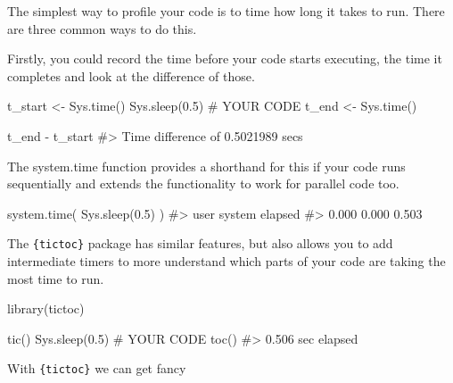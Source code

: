 \documentclass[
  letterpaper,
  DIV=11,
  numbers=noendperiod]{scrreprt}
\newenvironment{Shaded}{\begin{snugshade}}{\end{snugshade}}
\newcommand{\CommentTok}[1]{\textcolor[rgb]{0.37,0.37,0.37}{#1}}
\newcommand{\FloatTok}[1]{\textcolor[rgb]{0.68,0.00,0.00}{#1}}
\newcommand{\FunctionTok}[1]{\textcolor[rgb]{0.28,0.35,0.67}{#1}}
\newcommand{\NormalTok}[1]{\textcolor[rgb]{0.00,0.23,0.31}{#1}}
\newcommand{\OtherTok}[1]{\textcolor[rgb]{0.00,0.23,0.31}{#1}}
\newcommand{\SpecialCharTok}[1]{\textcolor[rgb]{0.37,0.37,0.37}{#1}}
\begin{document}
The simplest way to profile your code is to time how long it takes to
run. There are three common ways to do this.

Firstly, you could record the time before your code starts executing,
the time it completes and look at the difference of those.

\begin{Shaded}
\begin{Highlighting}[]
\NormalTok{t\_start }\OtherTok{\textless{}{-}} \FunctionTok{Sys.time}\NormalTok{()}
\FunctionTok{Sys.sleep}\NormalTok{(}\FloatTok{0.5}\NormalTok{) }\CommentTok{\# YOUR CODE}
\NormalTok{t\_end }\OtherTok{\textless{}{-}} \FunctionTok{Sys.time}\NormalTok{()}

\NormalTok{t\_end }\SpecialCharTok{{-}}\NormalTok{ t\_start}
\CommentTok{\#\textgreater{} Time difference of 0.5021989 secs}
\end{Highlighting}
\end{Shaded}

The system.time function provides a shorthand for this if your code runs
sequentially and extends the functionality to work for parallel code
too.

\begin{Shaded}
\begin{Highlighting}[]
\FunctionTok{system.time}\NormalTok{(}
  \FunctionTok{Sys.sleep}\NormalTok{(}\FloatTok{0.5}\NormalTok{)}
\NormalTok{)}
\CommentTok{\#\textgreater{}    user  system elapsed }
\CommentTok{\#\textgreater{}   0.000   0.000   0.503}
\end{Highlighting}
\end{Shaded}

The \texttt{\{tictoc\}} package has similar features, but also allows
you to add intermediate timers to more understand which parts of your
code are taking the most time to run.

\begin{Shaded}
\begin{Highlighting}[]
\FunctionTok{library}\NormalTok{(tictoc)}

\FunctionTok{tic}\NormalTok{() }
\FunctionTok{Sys.sleep}\NormalTok{(}\FloatTok{0.5}\NormalTok{) }\CommentTok{\# YOUR CODE }
\FunctionTok{toc}\NormalTok{()}
\CommentTok{\#\textgreater{} 0.506 sec elapsed}
\end{Highlighting}
\end{Shaded}

With \texttt{\{tictoc\}} we can get fancy
\end{document}
